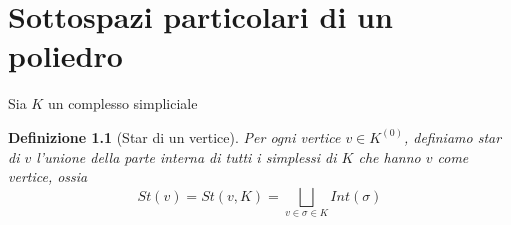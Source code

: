 \documentclass[a4paper]{report}
\newtheorem{definition}{Definizione}
\begin{document}
\chapter{Sottospazi particolari di un poliedro}
Sia $K$ un complesso simpliciale
\begin{definition}[Star di un vertice]
    Per ogni vertice $v\in K^{(0)}$, definiamo star di $v$ l'unione della parte interna di tutti i simplessi di $K$ che hanno $v$ come vertice, ossia
    \[
        St(v)=St(v,K)=\bigsqcup_{v\in\sigma\in K}Int(\sigma)
    \]
\end{definition}
\begin{center}



    \begin{tikzpicture}[x=0.75pt,y=0.75pt,yscale=-1,xscale=1]


\end{tikzpicture}
\end{center}
\end{document}
